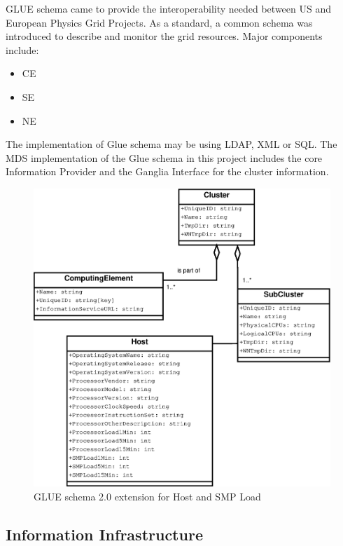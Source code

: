 \ac{GLUE} schema came to provide the interoperability needed between US and European Physics Grid Projects. As a standard, a common schema was introduced to describe and monitor the grid resources. Major components include:

\begin{itemize}
\item \acf{CE}
\item \acf{SE}
\item \ac{NE}
\end{itemize}

The implementation of Glue schema may be using LDAP, XML or SQL. The MDS implementation of the Glue schema in this project includes the core Information Provider and the Ganglia Interface for the cluster information.


\begin{figure}[htb]
\centering
 \includegraphics[width=130mm]{images/gluece_ext.eps}
\caption{GLUE schema 2.0 extension for Host and SMP Load}
\label{figure:gluece_ext}
\end{figure}


\subsection{Information Infrastructure}

